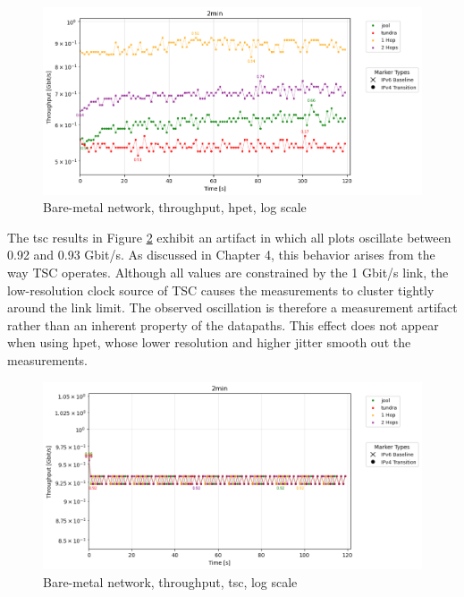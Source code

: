 \begin{figure}[H]
    \centering
    \includegraphics[width=1\textwidth]{resources/finalPlots/combinedplots/DoubleLocal_tcp_sameScale_hpet_2min_log.png}
    \caption{Bare-metal network, throughput, hpet, log scale}
    \label{fig:Dual_tcp_sameScale_hpet_log}
\end{figure}

The tsc results in Figure \ref{fig:Dual_tcp_sameScale_tsc_log} exhibit an artifact in which all plots oscillate between 0.92 and 0.93 Gbit/s. As discussed in Chapter 4, this behavior arises from the way TSC operates. Although all values are constrained by the 1 Gbit/s link, the low-resolution clock source of TSC causes the measurements to cluster tightly around the link limit. The observed oscillation is therefore a measurement artifact rather than an inherent property of the datapaths. This effect does not appear when using hpet, whose lower resolution and higher jitter smooth out the measurements.

\begin{figure}[H]
    \centering
    \includegraphics[width=1\textwidth]{resources/finalPlots/combinedplots/DoubleLocal_tcp_sameScale_tsc_2min_log.png}
    \caption{Bare-metal network, throughput, tsc, log scale}
    \label{fig:Dual_tcp_sameScale_tsc_log}
\end{figure}

